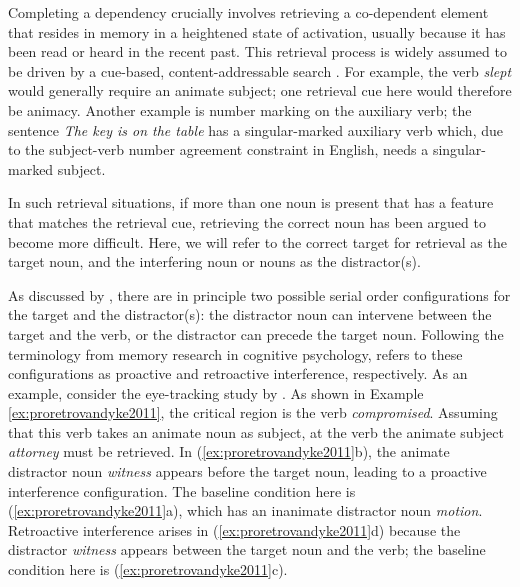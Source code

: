 \documentclass{cambridge7A}\usepackage[]{graphicx}\usepackage[]{color}
\begin{document}
 Completing a dependency crucially involves retrieving a co-dependent element that resides in memory in a heightened state of activation, usually because it has been read or heard in the recent past. 
  This retrieval process is widely assumed to be driven by a  cue-based,   content-addressable search \citep{McElreeForakerDyer2003}. For example, the verb \textit{slept} would  generally require an animate subject; one retrieval cue here would therefore be animacy. Another example is number marking on the auxiliary verb; the sentence \textit{The key is on the table} has a singular-marked auxiliary verb which, due to the subject-verb number agreement constraint in English, needs a singular-marked subject. 
  
In such retrieval situations, if more than one noun is present that has a feature that matches the retrieval cue, retrieving the correct noun has been argued to become more difficult.  Here, we will refer to the correct target for retrieval as the target noun, and the interfering noun or nouns as the distractor(s). 
  
As discussed by \cite{lewis:magical},  there are in principle two possible serial order configurations for the target and the distractor(s): the distractor  noun can intervene between the target and the verb, or the distractor can precede the target noun.
Following the terminology from memory research in cognitive psychology, \cite{lewis:magical} refers to these configurations  as  proactive  and retroactive interference, respectively. 
As an example, consider the eye-tracking study by
\cite{VanDykeMcElree2011}.
As shown in Example \ref{ex:proretrovandyke2011}, the critical region is the verb \textit{compromised}.
Assuming that this verb takes an animate noun as subject, 
at the verb the animate subject \textit{attorney} must be retrieved. In 
(\ref{ex:proretrovandyke2011}b), the animate distractor noun \textit{witness} appears before the target noun, leading to a proactive interference configuration. The baseline condition here is (\ref{ex:proretrovandyke2011}a), which has an inanimate distractor noun \textit{motion}.   
Retroactive interference arises in (\ref{ex:proretrovandyke2011}d) because the distractor \textit{witness} appears between the target noun and the verb; the baseline condition here is (\ref{ex:proretrovandyke2011}c).
\end{document}
